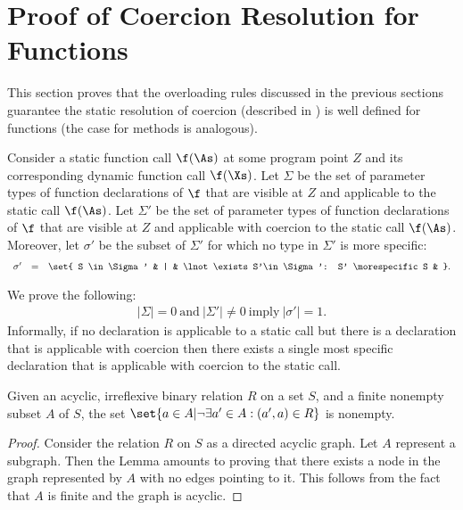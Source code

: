 %
%
%
%

\section{Proof of Coercion Resolution for Functions}

This section proves that the overloading rules discussed in the previous
sections guarantee the static resolution of coercion
(described in ) is well defined for functions
(the case for methods is analogous).

Consider a static function call $\f(\As)$ at some program point $Z$
and its corresponding dynamic function call $\f(\Xs)$.  Let $\Sigma$
be the set of parameter types of function declarations of $\f$ that
are visible at $Z$ and applicable to the static call $\f(\As)$.  Let
$\Sigma'$ be the set of parameter types of function declarations of
$\f$ that are visible at $Z$ and applicable with coercion to the
static call $\f(\As)$.  Moreover, let $\sigma'$ be the subset of
$\Sigma'$ for which no type in $\Sigma'$ is more specific:
\[
\begin{array}{lclcll}
\sigma' & = & \set{ S \in\Sigma' & | & \lnot \exists S'\in\Sigma': S' \morespecific S & }.
\end{array}
\]

We prove the following:
\[
\begin{array}{l}
|\Sigma| = 0 \ \text{and} \ |\Sigma'| \neq 0 \ \text{imply} \ |\sigma'| = 1.
\end{array}
\]
Informally, if no declaration is applicable to a static call but there
is a declaration that is applicable with coercion then there exists a
single most specific declaration that is applicable with coercion to
the static call.
\\
\begin{lemma}
\label{lem:nonempty}
Given an acyclic, irreflexive binary relation $R$ on a set $S$, and a
finite nonempty subset $A$ of $S$, the set $\set{a \in A| \lnot
\exists a' \in A : (a',a) \in R}$ is nonempty.
\end{lemma}

\begin{proof}
Consider the relation $R$ on $S$ as a directed acyclic graph.  Let $A$
represent a subgraph.  Then the Lemma amounts to proving that there
exists a node in the graph represented by $A$ with no edges pointing
to it.  This follows from the fact that $A$ is finite and the graph is
acyclic.
\end{proof}

